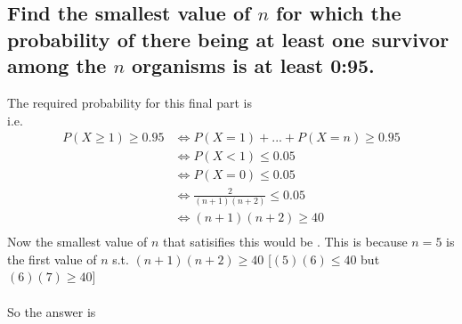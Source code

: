 \documentclass[10pt]{article}
\begin{document}
\subsection{Find the smallest value of $n$ for which the probability of there being at least one survivor among the $n$ organisms is at least 0:95.}
The required probability for this final part is \\
i.e.
\begin{align*}
    P(X\geq 1) \geq 0.95  &\iff P(X=1) + ... + P(X=n) \geq 0.95 \\
                          &\iff P(X<1) \leq 0.05 \\
                          &\iff P(X=0) \leq 0.05 \\
                          &\iff \frac{2}{(n+1)(n+2)} \leq 0.05 \\
                          &\iff (n+1)(n+2) \geq 40 \\
\end{align*}
Now the smallest value of $n$ that satisifies this would be . This is because $n=5$ is the first value of $n$ s.t. $(n+1)(n+2) \geq 40$ [$(5)(6)\leq 40$ but $(6)(7) \geq 40$] \\ \\
So the answer is 
\end{document}
